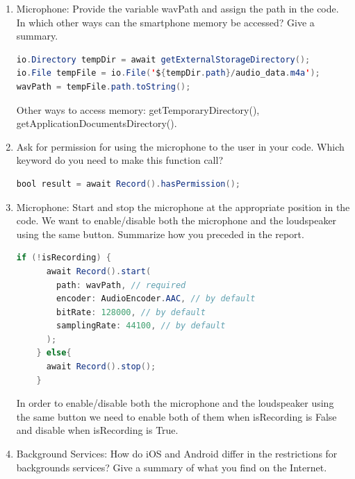 \documentclass{homework}
\begin{document}
\begin{enumerate}
	\begin{lstlisting}[language=Java, caption=Implementation of recording in .dart file]
  Future<void> playRecord() async{
    if (!isRecording) {
      audioCache.loop('20kHz_test.wav');
    }
    else {
      advancedPlayer.stop();
    }
    setState(() {
      isRecording = !isRecording;
    });
	\end{lstlisting}
	When FloatingActionButton is pressed we fall into playRecord function. isRecoding - bool variable initialized as False. audioCache - object of class AudioCache, this object is initialized earlier. advancedPlayer - object of class AdvancedPlayer, this object is initialized earlier. If we are not recording now, we start encoding using loop method. If we are recording now FloatingActionButton stops recording. After each press isRecoding changes its status.
	\item Microphone: Provide the variable wavPath and assign the path in the code. In which other ways can the smartphone memory be accessed? Give a summary.
	\begin{lstlisting}[language=Java, caption=Implementation of wavPath in .dart file]
io.Directory tempDir = await getExternalStorageDirectory();
io.File tempFile = io.File('${tempDir.path}/audio_data.m4a');
wavPath = tempFile.path.toString();
	\end{lstlisting}

	Other ways to access memory: getTemporaryDirectory(), getApplicationDocumentsDirectory().
	\item Ask for permission for using the microphone to the user in your code. Which keyword do you need to make this function call?
	\begin{lstlisting}[language=Java, caption=Asking for permissiom in .dart file]
bool result = await Record().hasPermission();
	\end{lstlisting}
	\item Microphone: Start and stop the microphone at the appropriate position in the code. We want to enable/disable both the microphone and the loudspeaker using the same button. Summarize how you preceded in the report.
	\begin{lstlisting}[language=Java, caption=Implementation of microphone in .dart file]
    if (!isRecording) {
      await Record().start(
        path: wavPath, // required
        encoder: AudioEncoder.AAC, // by default
        bitRate: 128000, // by default
        samplingRate: 44100, // by default
      );
    } else{
      await Record().stop();
    }
	\end{lstlisting}
	In order to enable/disable both the microphone and the loudspeaker using the same button we need to enable both of them when isRecording is False and 
disable when isRecording is True.
	\item Background Services: How do iOS and Android differ in the restrictions for backgrounds services? Give a summary of what you find on the Internet.


\end{enumerate}
\end{document}
